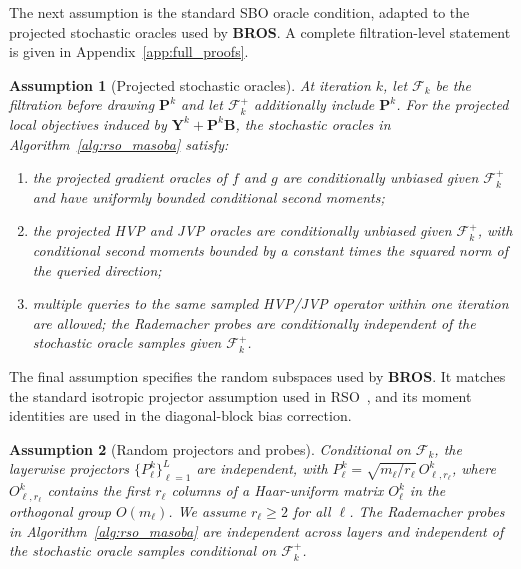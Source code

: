 \documentclass{pkumelon}
\newenvironment{limbox}{\begin{limitationbox}}{\end{limitationbox}}
\theoremstyle{plain}
\newtheorem{assumption}{Assumption}
\newcommand{\oursname}{\textnormal{\textbf{BROS}}}
\newcommand{\ourslast}{\oursname}
\begin{document}
The next assumption is the standard SBO oracle condition, adapted to the projected stochastic oracles used by \ourslast. A complete filtration-level statement is given in Appendix~\ref{app:full_proofs}.
\begin{limbox}
\begin{assumption}[Projected stochastic oracles]
\label{as:A2}
At iteration $k$, let $\mathcal F_k$ be the filtration before drawing $\boldsymbol P^k$ and let $\mathcal F_k^+$ additionally include $\boldsymbol P^k$. For the projected local objectives induced by $\boldsymbol Y^k+\boldsymbol P^k\boldsymbol B$, the stochastic oracles in Algorithm~\ref{alg:rso_masoba} satisfy:
\begin{enumerate}[leftmargin=1.5em,label=\arabic*.,topsep=1pt,itemsep=1pt,parsep=0pt,partopsep=0pt]
    \item the projected gradient oracles of $f$ and $g$ are conditionally unbiased given $\mathcal F_k^+$ and have uniformly bounded conditional second moments;
    \item the projected HVP and JVP oracles are conditionally unbiased given $\mathcal F_k^+$, with conditional second moments bounded by a constant times the squared norm of the queried direction;
    \item multiple queries to the same sampled HVP/JVP operator within one iteration are allowed; the Rademacher probes are conditionally independent of the stochastic oracle samples given $\mathcal F_k^+$.
\end{enumerate}
\end{assumption}
\end{limbox}

The final assumption specifies the random subspaces used by \ourslast. It matches the standard isotropic projector assumption used in RSO~\citep{chen2025memory}, and its moment identities are used in the diagonal-block bias correction.

\begin{limbox}
\begin{assumption}[Random projectors and probes]
\label{as:A3}
Conditional on $\mathcal F_k$, the layerwise projectors $\{P_\ell^k\}_{\ell=1}^L$ are independent, with $P_\ell^k=\sqrt{m_\ell/r_\ell}\,O_{\ell,r_\ell}^k$, where $O_{\ell,r_\ell}^k$ contains the first $r_\ell$ columns of a Haar-uniform matrix $O_\ell^k$ in the orthogonal group $O(m_\ell)$. We assume $r_\ell\ge2$ for all $\ell$. The Rademacher probes in Algorithm~\ref{alg:rso_masoba} are independent across layers and independent of the stochastic oracle samples conditional on $\mathcal F_k^+$.
\end{assumption}
\end{limbox}
\end{document}
